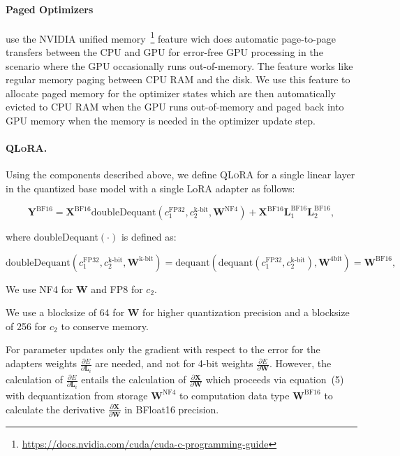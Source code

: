 \paragraph{Paged Optimizers} use the NVIDIA unified memory~\footnote{\tiny \url{https://docs.nvidia.com/cuda/cuda-c-programming-guide}} feature wich does automatic page-to-page transfers between the CPU and GPU for error-free GPU processing in the scenario where the GPU occasionally runs out-of-memory. The feature works like regular memory paging between CPU RAM and the disk. We use this feature to allocate paged memory for the optimizer states which are then automatically evicted to CPU RAM when the GPU runs out-of-memory and paged back into GPU memory when the memory is needed in the optimizer update step.

\paragraph{\textsc{QLoRA}.} Using the components described above, we define \textsc{QLoRA} for a single linear layer in the quantized base model with a single LoRA adapter as follows:

\begin{equation}
    \mathbf{Y}^{\text{BF16}} =  \mathbf{X}^{\text{BF16}} \text{doubleDequant}(c_1^{\text{FP32}}, c_2^{\text{k-bit}}, \mathbf{W}^{\text{NF4}}) + \mathbf{X}^{\text{BF16}}\mathbf{L}^{\text{BF16}}_1\mathbf{L}^{\text{BF16}}_2,
\end{equation}

where doubleDequant$(\cdot)$ is defined as:

\begin{equation}
    \text{doubleDequant}(c_1^{\text{FP32}}, c_2^{\text{k-bit}}, \mathbf{W}^{\text{k-bit}}) = \text{dequant}(\text{dequant}(c_1^{\text{FP32}}, c_2^{\text{k-bit}}), \mathbf{W}^{\text{4bit}}) = \mathbf{W}^{\text{BF16}},
\end{equation}

We use NF4 for $\mathbf{W}$ and FP8 for $c_2$.

We use a blocksize of 64 for $\mathbf{W}$ for higher quantization precision and a blocksize of 256 for $c_2$ to conserve memory.

For parameter updates only the gradient with respect to the error for the adapters weights $\frac{\partial E}{\partial \mathbf{L}_i}$ are needed, and not for 4-bit weights $\frac{\partial E}{\partial \mathbf{W}}$. However, the calculation of $\frac{\partial E}{\partial \mathbf{L}_i}$ entails the calculation of $\frac{\partial \mathbf{X}}{\partial \mathbf{W}}$ which proceeds via equation~(5) with dequantization from storage $\mathbf{W}^{\text{NF4}}$ to computation data type $\mathbf{W}^{\text{BF16}}$ to calculate the derivative $\frac{\partial \mathbf{X}}{\partial \mathbf{W}}$ in BFloat16 precision.

